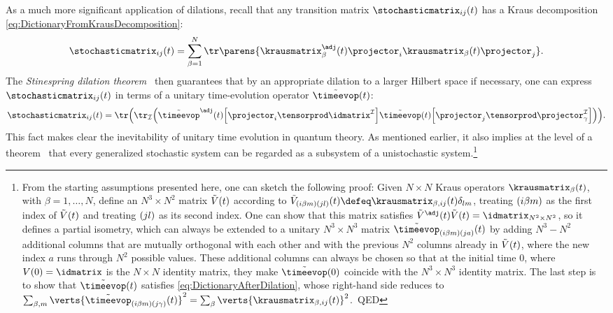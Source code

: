 \documentclass[12pt,english,prl,superscriptaddress,nobibnotes,nofootinbib]{revtex4-2}
\let\originalleft\left
\let\originalright\right
\renewcommand{\left}{\mathopen{}\mathclose\bgroup\originalleft}
\renewcommand{\right}{\aftergroup\egroup\originalright}
\begin{document}
As a much more significant application of dilations, recall that any
transition matrix $\stochasticmatrix_{ij}\left(t\right)$ has a Kraus
decomposition \eqref{eq:DictionaryFromKrausDecomposition}: 
\begin{equation}
\stochasticmatrix_{ij}\left(t\right)=\sum_{\beta=1}^{N}\tr\parens{\krausmatrix_{\beta}^{\adj}\left(t\right)\projector_{i}\krausmatrix_{\beta}\left(t\right)\projector_{j}}.\label{eq:DictionaryFromKrausDecompositionForDilation}
\end{equation}
 The \emph{Stinespring dilation theorem}~\citep{Stinespring:1955pfoc,Keyl:2002foqit}
then guarantees that by an appropriate dilation to a larger Hilbert
space if necessary, one can express $\stochasticmatrix_{ij}\left(t\right)$
in terms of a unitary time-evolution operator $\tilde{\timeevop}\left(t\right)$:
\begin{equation}
\stochasticmatrix_{ij}\left(t\right)=\tr\left(\tr_{\mathcal{I}}\left(\tilde{\timeevop}^{\adj}\left(t\right)\left[\projector_{i}\tensorprod\idmatrix^{\mathcal{I}}\right]\tilde{\timeevop}\left(t\right)\left[\projector_{j}\tensorprod\projector_{\gamma}^{\mathcal{I}}\right]\right)\right).\label{eq:DictionaryAfterDilation}
\end{equation}
 This fact makes clear the inevitability of unitary time evolution
in quantum theory. As mentioned earlier, it also implies at the level
of a theorem~\citep{Barandes:2023tsqt} that every generalized stochastic
system can be regarded as a subsystem of a unistochastic system.\footnote{From the starting assumptions presented here, one can sketch the following
proof: Given $N\times N$ Kraus operators $\krausmatrix_{\beta}\left(t\right)$,
with $\beta=1,\dots,N$, define an $N^{3}\times N^{2}$ matrix $\tilde{V}\left(t\right)$
according to $\tilde{V}_{\left(i\beta m\right)\left(jl\right)}\left(t\right)\defeq\krausmatrix_{\beta,ij}\left(t\right)\delta_{lm}$,
treating $\left(i\beta m\right)$ as the first index of $\tilde{V}\left(t\right)$
and treating $\left(jl\right)$ as its second index. One can show
that this matrix satisfies $\tilde{V}^{\adj}\left(t\right)\tilde{V}\left(t\right)=\idmatrix_{N^{2}\times N^{2}}$,
so it defines a partial isometry, which can always be extended to
a unitary $N^{3}\times N^{3}$ matrix $\tilde{\timeevop}_{\left(i\beta m\right)\left(ja\right)}\left(t\right)$
by adding $N^{3}-N^{2}$ additional columns that are mutually orthogonal
with each other and with the previous $N^{2}$ columns already in
$\tilde{V}\left(t\right)$, where the new index $a$ runs through
$N^{2}$ possible values. These additional columns can always be chosen
so that at the initial time $0$, where $V\left(0\right)=\idmatrix$
is the $N\times N$ identity matrix, they make $\tilde{\timeevop}\left(0\right)$
coincide with the $N^{3}\times N^{3}$ identity matrix. The last step
is to show that $\tilde{\timeevop}\left(t\right)$ satisfies \eqref{eq:DictionaryAfterDilation},
whose right-hand side reduces to $\sum_{\beta,m}\verts{\tilde{\timeevop}_{\left(i\beta m\right)\left(j\gamma\right)}\left(t\right)}^{2}=\sum_{\beta}\verts{\krausmatrix_{\beta,ij}\left(t\right)}^{2}$.~QED}
\end{document}

